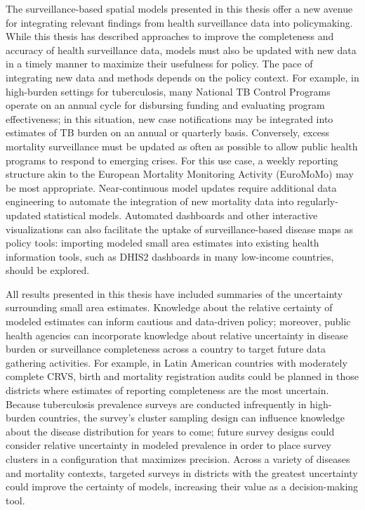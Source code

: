 \documentclass[
]{article}
\begin{document}
The surveillance-based spatial models presented in this thesis offer a new avenue for integrating relevant findings from health surveillance data into policymaking. While this thesis has described approaches to improve the completeness and accuracy of health surveillance data, models must also be updated with new data in a timely manner to maximize their usefulness for policy. The pace of integrating new data and methods depends on the policy context. For example, in high-burden settings for tuberculosis, many National TB Control Programs operate on an annual cycle for disbursing funding and evaluating program effectiveness; in this situation, new case notifications may be integrated into estimates of TB burden on an annual or quarterly basis. Conversely, excess mortality surveillance must be updated as often as possible to allow public health programs to respond to emerging crises. For this use case, a weekly reporting structure akin to the European Mortality Monitoring Activity (EuroMoMo) may be most appropriate. Near-continuous model updates require additional data engineering to automate the integration of new mortality data into regularly-updated statistical models. Automated dashboards and other interactive visualizations can also facilitate the uptake of surveillance-based disease maps as policy tools: importing modeled small area estimates into existing health information tools, such as DHIS2 dashboards in many low-income countries, should be explored.

All results presented in this thesis have included summaries of the uncertainty surrounding small area estimates. Knowledge about the relative certainty of modeled estimates can inform cautious and data-driven policy; moreover, public health agencies can incorporate knowledge about relative uncertainty in disease burden or surveillance completeness across a country to target future data gathering activities. For example, in Latin American countries with moderately complete CRVS, birth and mortality registration audits could be planned in those districts where estimates of reporting completeness are the most uncertain. Because tuberculosis prevalence surveys are conducted infrequently in high-burden countries, the survey's cluster sampling design can influence knowledge about the disease distribution for years to come; future survey designs could consider relative uncertainty in modeled prevalence in order to place survey clusters in a configuration that maximizes precision. Across a variety of diseases and mortality contexts, targeted surveys in districts with the greatest uncertainty could improve the certainty of models, increasing their value as a decision-making tool.
\end{document}

